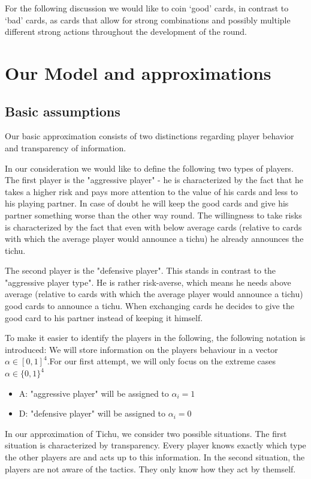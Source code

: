 For the following discussion we would like to coin ‘good’ cards, in contrast to ‘bad’ cards, as cards that allow for strong combinations and possibly multiple different strong actions throughout the development of the round.


\section{Our Model and approximations}
\subsection{Basic assumptions}
Our basic approximation consists of two distinctions regarding player behavior and transparency of information. 

In our consideration we would like to define the following two types of players.
The first player is the "aggressive player" - he is characterized by the fact that he takes a higher risk and pays more attention to the value of his cards and less to his playing partner. In case of doubt he will keep the good cards and give his partner something worse than the other way round.
The willingness to take risks is characterized by the fact that even with below average cards (relative to cards with which the average player would announce a tichu) he already announces the tichu. 

The second player is the "defensive player". This stands in contrast to the "aggressive player type". He is rather risk-averse, which means he needs above average (relative to cards with which the average player would announce a tichu) good cards to announce a tichu.
When exchanging cards he decides to give the good card to his partner instead of keeping it himself.

To make it easier to identify the players in the following, the following notation is introduced:
We will store information on the players behaviour in a vector $\alpha \in [0,1]^4$.For our first attempt, we will only focus on the extreme cases $\alpha \in \{0,1\}^4$
\\ 
\begin{itemize}
\item A: "aggressive player" will be assigned to $\alpha_i = 1$
\item D: "defensive player" will be assigned to $\alpha_i = 0$ \\
\end{itemize} 
In our approximation of Tichu, we consider two possible situations. 
The first situation is characterized by transparency. Every player knows exactly which type the other players are and acts up to this information.
In the second situation, the players are not aware of the tactics. They only know how they act by themself.

